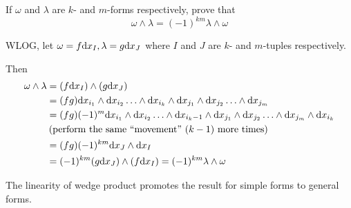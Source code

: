 \documentclass[a4paper, 12pt]{article}
\begin{document}
\begin{problem} 
If $\omega$ and $\lambda$ are $k$- and $m$-forms respectively, prove that \[
\omega \wedge \lambda = (-1)^{km} \lambda \wedge \omega
\]
\end{problem}
\begin{solution}
    WLOG, let $\omega = f \mathrm{d} x_I, \lambda = g \mathrm{d} x_J$ where $I$ and $J$ are $k$- and $m$-tuples respectively.

    Then \begin{align*}
        \omega \wedge \lambda &= (f \mathrm{d} x_I) \wedge (g \mathrm{d} x_J) \\
        &= (fg) \mathrm{d} x_{i_1} \wedge \mathrm{d} x_{i_2} \ldots \wedge \mathrm{d} x_{i_k} \wedge \mathrm{d} x_{j_1} \wedge \mathrm{d} x_{j_2} \ldots \wedge \mathrm{d} x_{j_m} \\
        &= (fg) (-1)^m \mathrm{d} x_{i_1} \wedge \mathrm{d} x_{i_2} \ldots \wedge \mathrm{d} x_{i_k-1} \wedge \mathrm{d} x_{j_1} \wedge \mathrm{d} x_{j_2} \ldots \wedge \mathrm{d} x_{j_m} \wedge \mathrm{d} x_{i_k} \\
        & \:\text{(perform the same ``movement'' $(k-1)$ more times)}\: \\
        &= (fg)(-1)^{km} \mathrm{d} x_J \wedge \mathrm{d} x_I\\
        &= (-1)^{km} (g \mathrm{d} x_J) \wedge (f \mathrm{d} x_I) = (-1)^{km} \lambda \wedge \omega
    \end{align*}

    The linearity of wedge product promotes the result for simple forms to general forms.
\end{solution}
\end{document}
